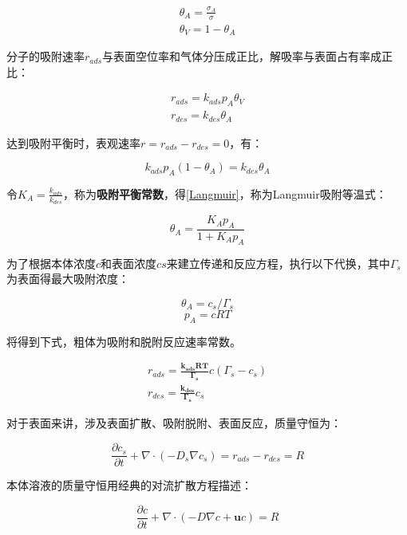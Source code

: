 \begin{gather}
    \theta_A = \frac{\sigma_A}{\sigma} \\
    \theta_V = 1-\theta_A
\end{gather}

分子的吸附速率$ r_{ads} $与表面空位率和气体分压成正比，解吸率与表面占有率成正比：

\begin{gather}
    r_{ads} = k_{ads}p_A\theta_V \\
    r_{des} = k_{des}\theta_A
\end{gather}

达到吸附平衡时，表观速率$ r=r_{ads}-r_{des}=0 $，有：

\[k_{ads}p_A(1-\theta_A)=k_{des}\theta_A\]

令$ K_A=\frac{k_{ads}}{k_{des}} $，称为\textbf{吸附平衡常数}，得\autoref{Langmuir}，称为Langmuir吸附等温式：

\begin{equation}\label{Langmuir}
    \theta_A = \frac{K_Ap_A}{1+K_Ap_A}
\end{equation}

为了根据本体浓度$ c $和表面浓度$ cs $来建立传递和反应方程，执行以下代换，其中$ \Gamma_s $为表面得最大吸附浓度：

\[\theta_A = c_s/\Gamma_s\]
\[p_A=cRT\]

将得到下式，粗体为吸附和脱附反应速率常数。

\begin{gather}
    r_{ads} = \bm{\frac{k_{ads}RT}{\Gamma_s}}c(\Gamma_s-c_s)\\
    r_{des} = \bm{\frac{k_{des}}{\Gamma_s}}c_s
\end{gather}

对于表面来讲，涉及表面扩散、吸附脱附、表面反应，质量守恒为：

\begin{equation}
    \frac{\partial c_s}{\partial t}+\nabla\cdot(-D_s\nabla c_s) = r_{ads}-r_{des}=R
\end{equation}

本体溶液的质量守恒用经典的对流扩散方程描述：

\begin{equation}
    \frac{\partial c}{\partial t} + \nabla\cdot(-D\nabla c+\bm{u}c) = R
\end{equation}
